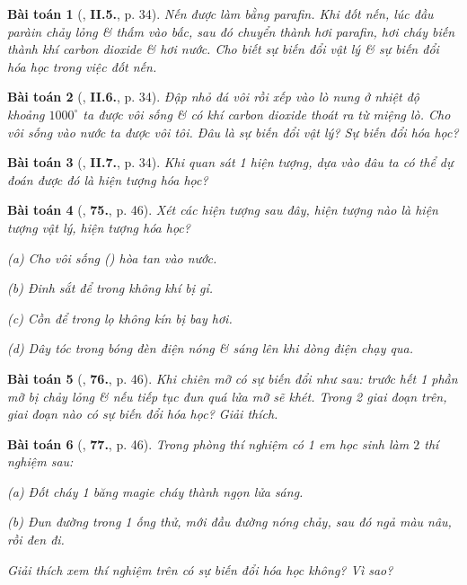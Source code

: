 \documentclass{article}
\numberwithin{equation}{section}
\newtheorem{baitoan}{Bài toán}
\begin{document}
\begin{baitoan}[\cite{Truong2021}, \textbf{II.5.}, p. 34]
	Nến được làm bằng parafin. Khi đốt nến, lúc đầu paràin chảy lỏng \& thấm vào bấc, sau đó chuyển thành hơi parafin, hơi cháy biến thành khí carbon dioxide \& hơi nước. Cho biết sự biến đổi vật lý \& sự biến đổi hóa học trong việc đốt nến.
\end{baitoan}

\begin{baitoan}[\cite{Truong2021}, \textbf{II.6.}, p. 34]
	Đập nhỏ đá vôi rồi xếp vào lò nung ở nhiệt độ khoảng $1000^\circ$ ta được vôi sống \& có khí carbon dioxide thoát ra từ miệng lò. Cho vôi sống vào nước ta được vôi tôi. Đâu là sự biến đổi vật lý? Sự biến đổi hóa học?
\end{baitoan}

\begin{baitoan}[\cite{Truong2021}, \textbf{II.7.}, p. 34]
	Khi quan sát 1 hiện tượng, dựa vào đâu ta có thể dự đoán được đó là hiện tượng hóa học?
\end{baitoan}

\begin{baitoan}[\cite{An_400_BT_Hoa_Hoc_8_2020}, \textbf{75.}, p. 46]
	Xét các hiện tượng sau đây, hiện tượng nào là hiện tượng vật lý, hiện tượng hóa học?
	\begin{enumerate*}
		\item[(a)] Cho vôi sống () hòa tan vào nước.
		\item[(b)] Đinh sắt để trong không khí bị gỉ.
		\item[(c)] Cồn để trong lọ không kín bị bay hơi.
		\item[(d)] Dây tóc trong bóng đèn điện nóng \& sáng lên khi dòng điện chạy qua.
	\end{enumerate*}
\end{baitoan}

\begin{baitoan}[\cite{An_400_BT_Hoa_Hoc_8_2020}, \textbf{76.}, p. 46]
	Khi chiên mỡ có sự biến đổi như sau: trước hết 1 phần mỡ bị chảy lỏng \& nếu tiếp tục đun quá lửa mỡ sẽ khét. Trong 2 giai đoạn trên, giai đoạn nào có sự biến đổi hóa học? Giải thích.
\end{baitoan}

\begin{baitoan}[\cite{An_400_BT_Hoa_Hoc_8_2020}, \textbf{77.}, p. 46]
	Trong phòng thí nghiệm có 1 em học sinh làm $2$ thí nghiệm sau:
	\begin{enumerate*}
		\item[(a)] Đốt cháy 1 băng magie cháy thành ngọn lửa sáng.
		\item[(b)] Đun đường trong 1 ống thử, mới đầu đường nóng chảy, sau đó ngả màu nâu, rồi đen đi.
	\end{enumerate*}
	Giải thích xem thí nghiệm trên có sự biến đổi hóa học không? Vì sao?
\end{baitoan}
\end{document}
